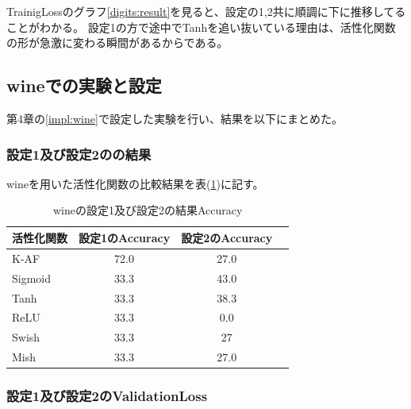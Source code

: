 TrainigLossのグラフ\ref{digits:result}を見ると、設定の1,2共に順調に下に推移してることがわかる。
設定1の方で途中でTanhを追い抜いている理由は、活性化関数の形が急激に変わる瞬間があるからである。


\subsection{wineでの実験と設定}
\label{ev:wineでの実験と設定}

第4章の\ref{impl:wine}で設定した実験を行い、結果を以下にまとめた。
\subsubsection{設定1及び設定2のの結果}

wineを用いた活性化関数の比較結果を表(\ref{result:winetable})に記す。


\begin{table}[htbp]
    \begin{center}
        \caption{wineの設定1及び設定2の結果Accuracy}
        \label{result:winetable}
        \vspace{2mm} 
        \begin{tabular}{l*{2}{c}r}
            活性化関数              & 設定1のAccuracy &  設定2のAccuracy \\
            \hline
            K-AF            & 72.0 & 27.0 \\
            Sigmoid            & 33.3 & 43.0\\
            Tanh            & 33.3 & 38.3\\
            ReLU        & 33.3 & 0.0\\
            Swish           & 33.3 & 27 \\
            Mish           & 33.3 &  27.0\\
    
        \end{tabular}
    \end{center}
\end{table}


\subsubsection{設定1及び設定2のValidationLoss}
\label{digits:loss}

